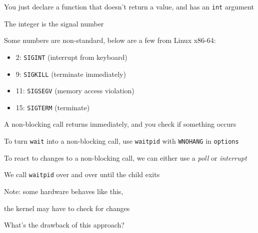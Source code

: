   \begin{slide}



    You just declare a function that doesn't return a value, and has an \texttt{int} argument

    \leftspace{}The integer is the signal number
    \medskip

    Some numbers are non-standard, below are a few from Linux x86-64:
    \begin{itemize}
      \item 2: \texttt{SIGINT} (interrupt from keyboard)
      \item 9: \texttt{SIGKILL} (terminate immediately)
      \item 11: \texttt{SIGSEGV} (memory access violation)
      \item 15: \texttt{SIGTERM} (terminate)
    \end{itemize}

  \end{slide}


  \begin{slide}


    A non-blocking call returns immediately, and you check if something occurs
    \medskip

    To turn \texttt{wait} into a non-blocking call, use \texttt{waitpid} with
    \texttt{WNOHANG} in \texttt{options}
    \medskip

    To react to changes to a non-blocking call, we can either use a
    \textit{poll} or \textit{interrupt}

  \end{slide}

  \begin{slide}


    We call \texttt{waitpid} over and over until the child exits

    \leftspace{}Note: some hardware behaves like this,

    \leftspace{}\leftspace{}the kernel may have to check for changes
    \bigskip

    What's the drawback of this approach?

  \end{slide}

